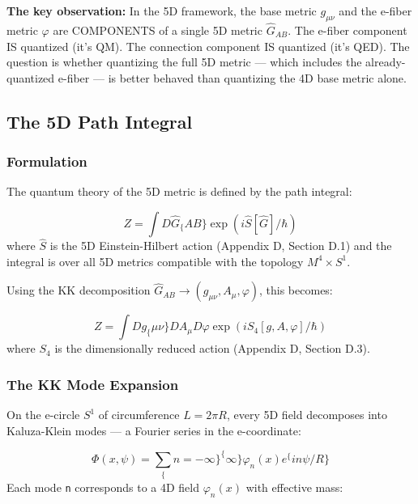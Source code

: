 \documentclass[aps,prd,preprint,superscriptaddress,longbibliography,floatfix]{revtex4-2}
\theoremstyle{remark}
\begin{document}
\textbf{The key observation:} In the 5D framework, the base metric $g_{\mu\nu}$ and the e-fiber metric $\varphi$ are COMPONENTS of a single 5D metric $\hat{G}_{AB}$. The e-fiber component IS quantized (it's QM). The connection component IS quantized (it's QED). The question is whether quantizing the full 5D metric --- which includes the already-quantized e-fiber --- is better behaved than quantizing the 4D base metric alone.



\subsection{The 5D Path Integral}


\subsubsection{Formulation}

The quantum theory of the 5D metric is defined by the path integral:


\begin{equation}
    Z = \int D\hat{G}_\{AB\} \exp(i\hat{S}[\hat{G}]/\hbar)
\end{equation}
where $\hat{S}$ is the 5D Einstein-Hilbert action (Appendix D, Section D.1) and the integral is over all 5D metrics compatible with the topology $M^{4} \times S^{1}$.

Using the KK decomposition $\hat{G}_{AB} \to (g_{\mu\nu}, A_\mu, \varphi)$, this becomes:


\begin{equation}
    Z = \int Dg_\{\mu\nu\} DA_\mu D\varphi \exp(iS_{4}[g, A, \varphi]/\hbar)
\end{equation}
where $S_{4}$ is the dimensionally reduced action (Appendix D, Section D.3).


\subsubsection{The KK Mode Expansion}

On the e-circle $S^{1}$ of circumference $L = 2\pi R$, every 5D field decomposes into Kaluza-Klein modes --- a Fourier series in the e-coordinate:


\begin{equation}
    \Phi(x, \psi) = \sum_\{n=-\infty\}^\{\infty\} \varphi_{n}(x) e^\{in\psi/R\}
\end{equation}
Each mode \texttt{n} corresponds to a 4D field $\varphi_{n}(x)$ with effective mass:
\end{document}
